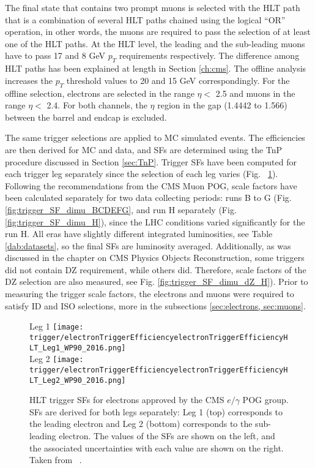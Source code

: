 \begin{small}
The final state that contains two prompt muons is selected with the HLT path that is a combination of several HLT paths chained using the logical ``OR'' operation, in other words, the muons are required to pass the selection of at least one of the HLT paths. At the HLT level, the leading and the sub-leading muons have to pass 17 and 8 GeV $p_T$ requirements respectively. The difference among HLT paths has been explained at length in Section \ref{ch:cms}. The offline analysis increases the $p_T$ threshold values to 20 and 15 GeV correspondingly. For the offline selection, electrons are selected in the range $\eta < $ 2.5 and muons in the range $\eta < $  2.4. For both channels, the $\eta$ region in the gap (1.4442 to 1.566) between the barrel and endcap is excluded.

The same trigger selections are applied to MC simulated events. The efficiencies are then derived for MC and data, and SFs are determined using the TnP procedure discussed in Section \ref{sec:TnP}. Trigger SFs have been computed for each trigger leg separately since the selection of each leg varies (Fig. ~\ref{fig:trigger_eff_diele}). Following the recommendations from the CMS Muon POG, scale factors have been calculated separately for two data collecting periods: runs B to G (Fig. \ref{fig:trigger_SF_dimu_BCDEFG}, and run H separately (Fig. \ref{fig:trigger_SF_dimu_H}), since the LHC conditions varied significantly for the run H. All eras have slightly different integrated luminosities, see Table \ref{dab:datasets}, so the final SFs are luminosity averaged. Additionally, as was discussed in the chapter on CMS Physics Objects Reconstruction, some triggers did not contain DZ requirement, while others did. Therefore, scale factors of the DZ selection are also measured, see Fig. \ref{fig:trigger_SF_dimu_dZ_H}). Prior to measuring the trigger scale factors, the electrons and muons were required to satisfy ID and ISO selections, more in the subsections \ref{sec:electrons, sec:muons}. 

\begin{figure}[H]
\centering
\subfloat Leg 1
{\texttt{[image: trigger/electronTriggerEfficiencyelectronTriggerEfficiencyHLT\_Leg1\_WP90\_2016.png]} } \\
\subfloat Leg 2
{\texttt{[image: trigger/electronTriggerEfficiencyelectronTriggerEfficiencyHLT\_Leg2\_WP90\_2016.png]} } \\
\caption[HLT trigger SFs for electrons.]{HLT trigger SFs for electrons approved by the CMS $e/ \gamma$ POG group.  SFs are derived for both legs separately: Leg 1 (top) corresponds to the leading electron and Leg 2 (bottom) corresponds to the sub-leading electron. The values of the SFs are shown on the left, and the associated uncertainties with each value are shown on the right. Taken from ~\cite{vhbbAN}.}
\label{fig:trigger_eff_diele}
\end{figure}


\end{small}
